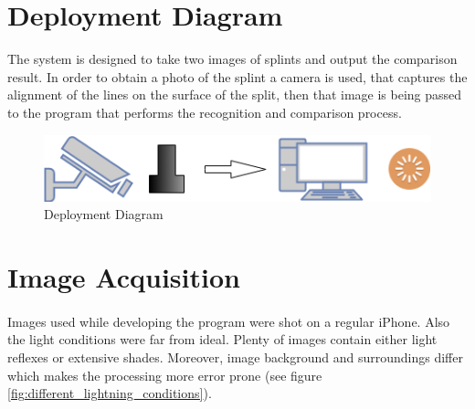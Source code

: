\section{Deployment Diagram}
The system is designed to take two images of splints and output the comparison result. In order to obtain a photo of the splint a camera is used, that captures the alignment of the lines on the surface of the split, then that image is being passed to the program that performs the recognition and comparison process.
\begin{figure}[h]
	\centering
	\includegraphics[width=\textwidth]{images/deployment_diagram}
	\caption{Deployment Diagram}
\end{figure}

\section{Image Acquisition}
\paragraph{}
Images used while developing the program were shot on a regular iPhone. Also the light conditions were far from ideal. Plenty of images contain either light reflexes or extensive shades. Moreover, image background and surroundings differ which makes the processing more error prone (see figure \ref{fig:different_lightning_conditions}).

